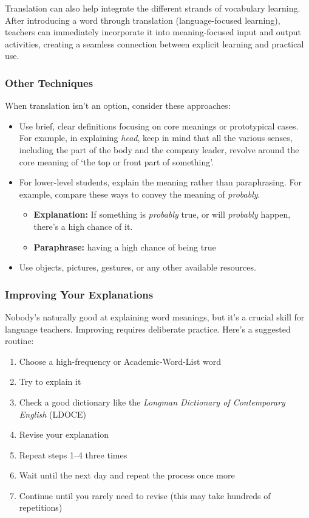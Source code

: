 Translation can also help integrate the different strands of vocabulary learning. After introducing a word through translation (language-focused learning), teachers can immediately incorporate it into meaning-focused input and output activities, creating a seamless connection between explicit learning and practical use.

\subsubsection{Other Techniques}

When translation isn't an option, consider these approaches:

\begin{itemize}
    \item Use brief, clear definitions focusing on core meanings or prototypical cases. For example, in explaining \textit{head}, keep in mind that all the various senses, including the part of the body and the company leader, revolve around the core meaning of `the top or front part of something'.
    \item For lower-level students, explain the meaning rather than paraphrasing. For example, compare these ways to convey the meaning of \textit{probably}.
    \begin{itemize}
        \item \textbf{Explanation:} If something is \textit{probably} true, or will \textit{probably} happen, there's a high chance of it.
        \item \textbf{Paraphrase:} having a high chance of being true
    \end{itemize}
    \item Use objects, pictures, gestures, or any other available resources.
\end{itemize}

\subsubsection{Improving Your Explanations}

Nobody's naturally good at explaining word meanings, but it's a crucial skill for language teachers. Improving requires deliberate practice. Here's a suggested routine:

\begin{enumerate}
    \item Choose a high-frequency or Academic-Word-List word
    \item Try to explain it
    \item Check a good dictionary like the \textit{Longman Dictionary of Contemporary English} (LDOCE)
    \item Revise your explanation
    \item Repeat steps 1--4 three times
    \item Wait until the next day and repeat the process once more
    \item Continue until you rarely need to revise (this may take hundreds of repetitions)
\end{enumerate}

